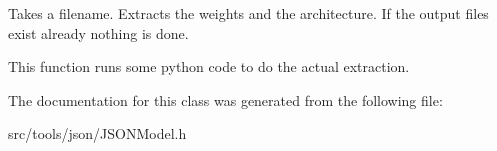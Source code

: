 Takes a filename. Extracts the weights and the architecture. If the output files exist already nothing is done. 

This function runs some python code to do the actual extraction. 

The documentation for this class was generated from the following file\+:\begin{DoxyCompactItemize}
\item 
src/tools/json/J\+S\+O\+N\+Model.\+h\end{DoxyCompactItemize}
